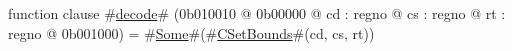function clause #\hyperref[zdecode]{decode}# (0b010010 @ 0b00000 @ cd : regno @ cs : regno @ rt : regno @ 0b001000) = #\hyperref[zSome]{Some}#(#\hyperref[zCSetBounds]{CSetBounds}#(cd, cs, rt))
